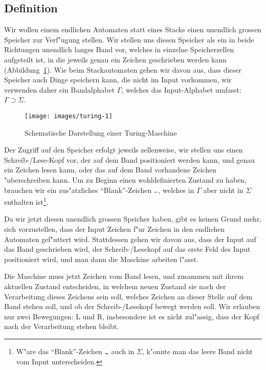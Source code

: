 \subsection{Definition}
Wir wollen einem endlichen Automaten statt eines Stacks einen unendlich
grossen Speicher zur Verf"ugung stellen. Wir stellen uns diesen
Speicher als ein in beide Richtungen unendlich langes Band vor,
welches in einzelne Speicherzellen aufgeteilt ist, in die jeweils
genau ein Zeichen geschrieben werden kann (Abbildung~\ref{turingfig}).
Wie beim Stackautomaten gehen
wir davon aus, dass dieser Speicher auch Dinge speichern kann, die nicht
im Input vorkommen, wir verwenden daher ein Bandalphabet $\Gamma$, welches
das Input-Alphabet umfasst: $\Gamma\supset \Sigma$.

\begin{figure}
\begin{center}
\texttt{[image: images/turing-1]}
\end{center}
\caption{Schematische Darstellung einer Turing-Maschine\label{turingfig}}
\end{figure}

Der Zugriff auf den Speicher erfolgt jeweils zellenweise, wir stellen
uns einen Schreib-/Lese-Kopf vor, der auf dem Band positioniert werden
kann, und genau ein Zeichen lesen kann, oder das auf dem Band vorhandene
Zeichen "uberschreiben kann. Um zu Beginn einen wohldefinierten Zustand
zu haben, brauchen wir ein zus"atzliches ``Blank''-Zeichen $\blank$,
welches in $\Gamma$ aber nicht in $\Sigma$ enthalten ist\footnote{W"are
das ``Blank''-Zeichen $\blank$ auch in $\Sigma$, k"onnte man das
leere Band nicht vom Input unterscheiden.}.

Da wir jetzt diesen unendlich grossen Speicher haben, gibt es keinen
Grund mehr, sich vorzustellen, dass der Input Zeichen f"ur Zeichen
in den endlichen Automaten gef"uttert wird. Stattdessen gehen wir
davon aus, dass der Input auf das Band geschrieben wird, der
Schreib-/Lesekopf auf das erste Feld des Input positioniert wird,
und man dann die Maschine arbeiten l"asst.

Die Maschine muss jetzt Zeichen vom Band lesen, und zusammen mit
ihrem aktuellen Zustand entscheiden, in welchem neuen Zustand
sie nach der Verarbeitung dieses Zeichens sein soll, welches Zeichen
an dieser Stelle auf dem Band stehen soll, und ob der Schreib-/Lesekopf
bewegt werden soll. Wir erlauben nur zwei Bewegungen: L und R, insbesondere
ist es nicht zul"assig, dass der Kopf nach der Verarbeitung stehen
bleibt.

